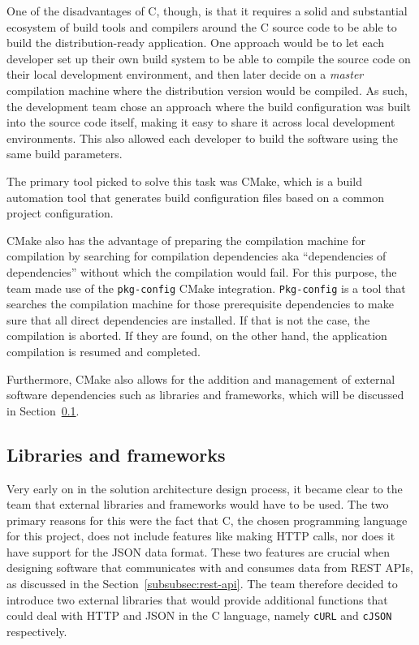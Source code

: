 One of the disadvantages of C, though, is that it requires a solid and substantial ecosystem of build tools and
compilers around the C source code to be able to build the distribution-ready application.
One approach would be to let each developer set up their own build system to be able to compile the source code on their
local development environment, and then later decide on a \textit{master} compilation machine where the distribution
version would be compiled.
As such, the development team chose an approach where the build configuration was built into the source code itself,
making it easy to share it across local development environments.
This also allowed each developer to build the software using the same build parameters.

The primary tool picked to solve this task was CMake, which is a build automation tool that generates build
configuration files based on a common project configuration.

CMake also has the advantage of preparing the compilation machine for compilation by searching for compilation
dependencies aka ``dependencies of dependencies'' without which the compilation would fail.
For this purpose, the team made use of the \lstinline{pkg-config} CMake integration.
\lstinline{Pkg-config} is a tool that searches the compilation machine for those prerequisite dependencies to make sure
that all direct dependencies are installed.
If that is not the case, the compilation is aborted.
If they are found, on the other hand, the application compilation is resumed and completed.

Furthermore, CMake also allows for the addition and management of external software dependencies such as libraries
and frameworks, which will be discussed in Section~\ref{subsec:libraries-and-frameworks}.

\subsection{Libraries and frameworks}\label{subsec:libraries-and-frameworks}


Very early on in the solution architecture design process, it became clear to the team that external libraries and
frameworks would have to be used.
The two primary reasons for this were the fact that C, the chosen programming language for this project, does not
include features like making HTTP calls, nor does it have support for the JSON data format.
These two features are crucial when designing software that communicates with and consumes data from REST APIs, as
discussed in the Section~\ref{subsubsec:rest-api}.
The team therefore decided to introduce two external libraries that would provide additional functions that could
deal with HTTP and JSON in the C language, namely \lstinline{cURL} and \lstinline{cJSON} respectively.

